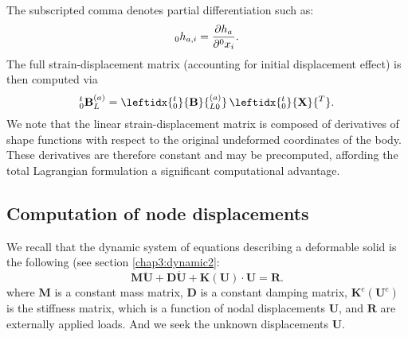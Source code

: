 The subscripted comma denotes partial differentiation such as:
\begin{equation}
_0 h_{a,i} = \dfrac{\partial h_a}{\partial ^0 x_i}.
\end{equation}
The full strain-displacement matrix (accounting for initial displacement effect) is then computed via
\begin{equation}
_0^t\mathbf{B}_{L}^{(a)} = \leftidx{_0^t}{ \mathbf{B} }{_{L0}^{(a)}} \, \leftidx{_0^t}{ \mathbf{X} }{^T}.
\end{equation} 
We note that the linear strain-displacement matrix is composed of derivatives of shape functions with respect to the original undeformed coordinates of the body. These derivatives are therefore constant and may be precomputed, affording the total Lagrangian formulation a significant computational advantage. 

	\subsection{Computation of node displacements} \label{chap5:computeNodalDisp}
We recall that the dynamic system of equations describing a deformable solid is the following (see section \ref{chap3:dynamic2}:
\begin{equation}
\label{chap5:eqDynamic}
\mathbf{M} \mathbf{\ddot U} + \mathbf{D} \mathbf{ \dot U} + \mathbf{K}(\mathbf{U}) \cdot \mathbf{U} = \mathbf{R}.
\end{equation}		
where $ \mathbf{M} $ is a constant mass matrix, $\mathbf{D}$ is a constant damping matrix, $ \mathbf{K}^e(\mathbf{U}^e) $ is the stiffness matrix, which is a function of nodal displacements $\mathbf{U}$, and $\mathbf{R}$ are externally applied loads. And we seek the unknown displacements $ \mathbf{U} $.
	
